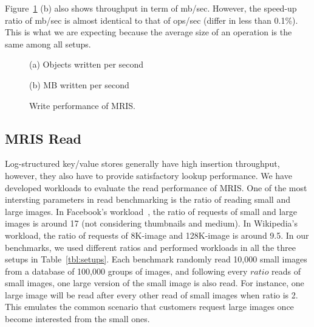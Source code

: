 
Figure~\ref{fig:mriswrite} (b) also shows throughput in term of
mb/sec.  However, the speed-up ratio of mb/sec is almost identical to
that of ops/sec (differ in less than 0.1\%). This is what we are
expecting because the average size of an operation is the same among
all setups.

\begin{figure}[t]
  \centering
  \begin{minipage}[c]{\linewidth}
    \centerline{\footnotesize(a) Objects written per second}\medskip
  \end{minipage}
  \begin{minipage}[c]{\linewidth}
    \centerline{\footnotesize(b) MB written per second}\medskip
  \end{minipage}
  \caption{Write performance of MRIS.}
  \label{fig:mriswrite}
\end{figure}

\subsection{MRIS Read}

Log-structured key/value stores generally have high insertion
throughput, however, they also have to provide satisfactory lookup
performance.  We have developed workloads to evaluate the read
performance of MRIS.  One of the most intersting parameters in read
benchmarking is the ratio of reading small and large images. In
Facebook's workload~\cite{beaver2010finding}, the ratio of requests of
small and large images is around 17 (not considering thumbnails and
medium). In Wikipedia's workload, the ratio of requests of 8K-image
and 128K-image is around 9.5. In our benchmarks, we used different
ratios and performed workloads in all the three setups in
Table~\ref{tbl:setups}. Each benchmark randomly read 10,000 small
images from a database of 100,000 groups of images, and following
every $ratio$ reads of small images, one large version of the small
image is also read. For instance, one large image will be read after
every other read of small images when ratio is 2. This emulates the
common scenario that customers request large images once become
interested from the small ones.

